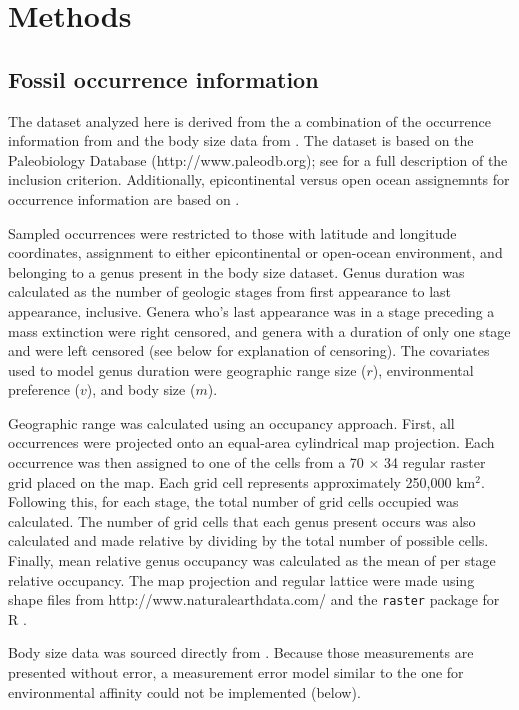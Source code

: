 \documentclass[12pt,letterpaper]{article}
\begin{document}
\section{Methods}

\subsection{Fossil occurrence information}

The dataset analyzed here is derived from the a combination of the occurrence information from \citet{Foote2013} and the body size data from \citet{Payne2014}. The \citet{Foote2013} dataset is based on the Paleobiology Database (http://www.paleodb.org); see \citet{Foote2013} for a full description of the inclusion criterion. Additionally, epicontinental versus open ocean assignemnts for occurrence information are based on \citet{Miller2009a}.

Sampled occurrences were restricted to those with latitude and longitude coordinates, assignment to either epicontinental or open-ocean environment, and belonging to a genus present in the body size dataset. Genus duration was calculated as the number of geologic stages from first appearance to last appearance, inclusive. Genera who's last appearance was in a stage preceding a mass extinction were right censored, and genera with a duration of only one stage and were left censored (see below for explanation of censoring). The covariates used to model genus duration were geographic range size (\(r\)), environmental preference (\(v\)), and body size (\(m\)). 

Geographic range was calculated using an occupancy approach. First, all occurrences were projected onto an equal-area cylindrical map projection. Each occurrence was then assigned to one of the cells from a 70 \(\times\) 34 regular raster grid placed on the map. Each grid cell represents approximately 250,000 km\(^{2}\). Following this, for each stage, the total number of grid cells occupied was calculated. The number of grid cells that each genus present occurs was also calculated and made relative by dividing by the total number of possible cells. Finally, mean relative genus occupancy was calculated as the mean of per stage relative occupancy. The map projection and regular lattice were made using shape files from http://www.naturalearthdata.com/ and the \texttt{raster} package for R \citep{raster}.

Body size data was sourced directly from \citet{Payne2014}. Because those measurements are presented without error, a measurement error model similar to the one for environmental affinity could not be implemented (below).
\end{document}
